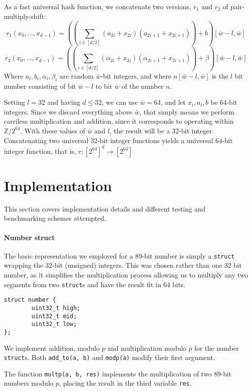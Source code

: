 \documentclass[]{article}
\newcommand{\funk}[1]{\small\texttt{#1}}
\begin{document}
As a fast universal hash function, we concatenate two versions, $r_1$ and $r_2$ of pair-multiply-shift:
\[r_1(x_0,\ldots ,x_{d-1}) = \left(\left(\sum_{i\in [d/2]}(a_{2i} + x_{2i})(a_{2i+1} + x_{2i+1}) \right)+b \right) [\bar{w}-l,\bar{w}]\]
\[r_2(x_0,\ldots ,x_{d-1}) = \left(\left(\sum_{i\in [d/2]}(\alpha_{2i} + x_{2i})(\alpha_{2i+1} + x_{2i+1}) \right)+\beta \right) [\bar{w}-l,\bar{w}]\]
Where $a_i,b_i,\alpha_i,\beta_i$ are random $\bar{w}$-bit integers, and where $n[\bar{w}-l,\bar{w}]$ is the $l$ bit number consisting of bit $\bar{w}-l$ to bit $\bar{w}$ of the number $n$.

Setting $l = 32$ and having $d\leq 32$, we can use $\bar{w} = 64$, and let $x_i,a_i,b$ be $64$-bit integers. Since we discard everything above $\bar{w}$, that simply means we perform carriless multiplication and addition, since it corresponds to operating within $\mathbb{Z}/2^{64}$. With these values of $\bar{w}$ and $l$, the result will be a $32$-bit integer. Concatenating two universal $32$-bit integer functions yields a universal $64$-bit integer function, that is, $r: [2^{64}]^d \to [2^{64}]$

\section{Implementation}

This section covers implementation details and different testing and benchmarking schemes attempted.

\paragraph{Number struct}

The basic representation we employed for a 89-bit number is simply a \funk{struct} wrapping the 32-bit (unsigned) integers. This was chosen rather than one 32 bit number, as it simplifies the multiplication process allowing us to multiply any two segments from two \funk{struct}s and have the result fit in 64 bits.

\begin{verbatim}
struct number {
        uint32_t high;
        uint32_t mid;
        uint32_t low;
};
\end{verbatim}

We implement addition, modulo $p$ and multiplication modulo $p$ for the number \funk{struct}s. Both \funk{add\_to(a, b)} and \funk{modp(a)} modify their first argument.

The function \funk{multp(a, b, res)} implements the multiplication of two 89-bit numbers modulo $p$, placing the result in the third variable \funk{res}.
\end{document}
